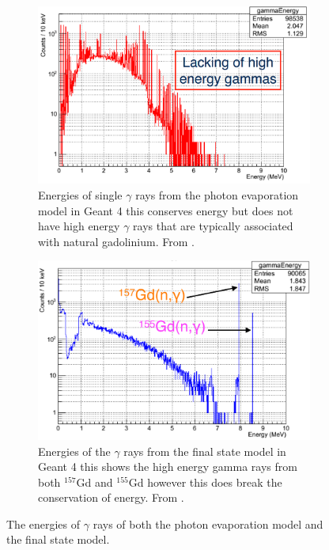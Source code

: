 \begin{figure}[htbp]
\centering
\begin{subfigure}{.5\textwidth}
  \centering
  \includegraphics[width=\linewidth]{Chapter4/Figs/Raster/gadolinium/photonEvaporationGd.png}
  \captionsetup{width=.9\linewidth}
  \caption{Energies of single $\gamma$ rays from the photon evaporation model in Geant 4 this conserves energy but does not have high energy $\gamma$ rays that are typically associated with natural gadolinium. From \cite{YuChen_2015}. }
  \label{subFig:differentGeant4Models_photonEvaporationGd}
\end{subfigure}%
\begin{subfigure}{.5\textwidth}
  \centering
  \includegraphics[width=\linewidth]{Chapter4/Figs/Raster/gadolinium/FinalStateGd.png}
  \captionsetup{width=.9\linewidth}
  \caption{Energies of the $\gamma$ rays from the final state model in Geant 4 this shows the high energy gamma rays from both $^{157}$Gd and $^{155}$Gd however this does break the conservation of energy. From \cite{YuChen_2015}. }
  \label{subFig:differentGeant4Models_finalStateGd}
\end{subfigure}
\caption{The energies of $\gamma$ rays of both the photon evaporation model and the final state model.}
\label{fig:differentGeant4Models}
\end{figure}

